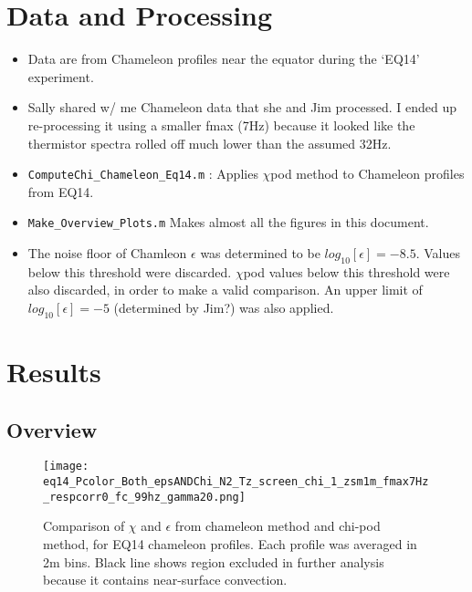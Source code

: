 \documentclass[11pt]{article}
\begin{document}
\clearpage
\section{Data and Processing}

\begin{itemize}

\item Data are from Chameleon profiles near the equator during the `EQ14' experiment.

\item Sally shared w/ me Chameleon data that she and Jim processed. I ended up re-processing it using a smaller fmax (7Hz) because it looked like the thermistor spectra rolled off much lower than the assumed 32Hz.

\item \verb+ComputeChi_Chameleon_Eq14.m+ : Applies $\chi$pod method to Chameleon profiles from EQ14.

\item \verb+Make_Overview_Plots.m+ Makes almost all the figures in this document.

\item The noise floor of Chamleon $\epsilon$ was determined to be $log_{10}[\epsilon]=-8.5$. Values below this threshold were discarded. $\chi$pod values below this threshold were also discarded, in order to make a valid comparison. An upper limit of $log_{10}[\epsilon]=-5$ (determined by Jim?) was also applied.

\end{itemize}




\clearpage
\section{Results}


\subsection{Overview}

\begin{figure}[htbp]
\texttt{[image: eq14\_Pcolor\_Both\_epsANDChi\_N2\_Tz\_screen\_chi\_1\_zsm1m\_fmax7Hz\_respcorr0\_fc\_99hz\_gamma20.png]}
\caption{Comparison of $\chi$ and $\epsilon$ from chameleon method and chi-pod method, for EQ14 chameleon profiles. Each profile was averaged in 2m bins.  Black line shows region excluded in further analysis because it contains near-surface convection.}
\label{chi_overview}
\end{figure}
\end{document}
